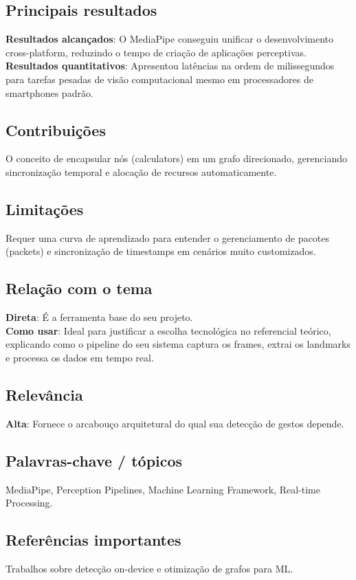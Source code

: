 \documentclass[12pt, a4paper]{article}
\begin{document}
\subsection{Principais resultados}
\textbf{Resultados alcançados}: O MediaPipe conseguiu unificar o desenvolvimento cross-platform, reduzindo o tempo de criação de aplicações perceptivas.\\
\textbf{Resultados quantitativos}: Apresentou latências na ordem de milissegundos para tarefas pesadas de visão computacional mesmo em processadores de smartphones padrão.\\
\subsection{Contribuições}
O conceito de encapsular nós (calculators) em um grafo direcionado, gerenciando sincronização temporal e alocação de recursos automaticamente.\\
\subsection{Limitações}
Requer uma curva de aprendizado para entender o gerenciamento de pacotes (packets) e sincronização de timestamps em cenários muito customizados.\\
\subsection{Relação com o tema}
\textbf{Direta}: É a ferramenta base do seu projeto.\\
\textbf{Como usar}: Ideal para justificar a escolha tecnológica no referencial teórico, explicando como o pipeline do seu sistema captura os frames, extrai os landmarks e processa os dados em tempo real.\\
\subsection{Relevância}
\textbf{Alta}: Fornece o arcabouço arquitetural do qual sua detecção de gestos depende.\\
\subsection{Palavras-chave / tópicos}
MediaPipe, Perception Pipelines, Machine Learning Framework, Real-time Processing.\\
\subsection{Referências importantes}
Trabalhos sobre detecção on-device e otimização de grafos para ML.
\newpage
\end{document}

